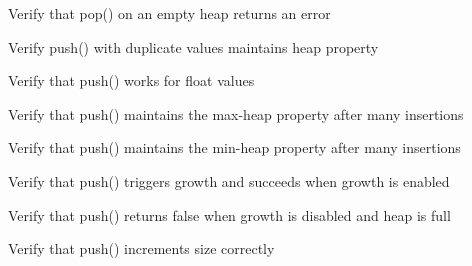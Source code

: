 \begin{DoxyRefList}
%
Verify that pop() on an empty heap returns an error  
\item[Global \doxylink{test__heap_8cpp_a9088f5e7aa934be4ec366f4ba8fb3a75}{TEST\+\_\+F} (\doxylink{classHeapMinTest}{Heap\+Min\+Test}, Push\+Duplicate\+Values\+Handled\+Correctly)]\label{test__test000279}%
%
Verify push() with duplicate values maintains heap property  
\item[Global \doxylink{test__heap_8cpp_ab740bd58210383212624244145042c8f}{TEST\+\_\+F} (\doxylink{classHeapFloatTest}{Heap\+Float\+Test}, Push\+Float\+Min\+Heap\+Works)]\label{test__test000278}%
%
Verify that push() works for float values  
\item[Global \doxylink{test__heap_8cpp_a580dd3058624d26f5b8f1825d145d04b}{TEST\+\_\+F} (\doxylink{classHeapMaxTest}{Heap\+Max\+Test}, Push\+Many\+Elements\+Maintains\+Max\+Heap\+Property)]\label{test__test000277}%
%
Verify that push() maintains the max-\/heap property after many insertions  
\item[Global \doxylink{test__heap_8cpp_a86c40c405f38599b1832d0e083a200fb}{TEST\+\_\+F} (\doxylink{classHeapMinTest}{Heap\+Min\+Test}, Push\+Many\+Elements\+Maintains\+Min\+Heap\+Property)]\label{test__test000276}%
%
Verify that push() maintains the min-\/heap property after many insertions  
\item[Global \doxylink{test__heap_8cpp_a75c77acfaef08ad9c586c392e93a4889}{TEST\+\_\+F} (\doxylink{classHeapMinTest}{Heap\+Min\+Test}, Push\+Triggers\+Growth\+When\+Enabled)]\label{test__test000275}%
%
Verify that push() triggers growth and succeeds when growth is enabled  
\item[Global \doxylink{test__heap_8cpp_a93c8eada4d18723ac18d15ed92c5b8e9}{TEST\+\_\+F} (\doxylink{classHeapMinTest}{Heap\+Min\+Test}, Push\+Returns\+False\+When\+Full\+No\+Growth)]\label{test__test000274}%
%
Verify that push() returns false when growth is disabled and heap is full  
\item[Global \doxylink{test__heap_8cpp_a5f1bff465c2602a3952d78c3be822b31}{TEST\+\_\+F} (\doxylink{classHeapMinTest}{Heap\+Min\+Test}, Push\+Increments\+Size)]\label{test__test000273}%
%
Verify that push() increments size correctly  
\item[Global \doxylink{test__heap_8cpp_a1bd3e4600f012a12f4224696c69426c1}{TEST\+\_\+F} (\doxylink{classHeapMaxTest}{Heap\+Max\+Test}, Max\+Heap\+Root\+Is\+Always\+Largest)]\label{test__test000272}%

\end{DoxyRefList}
